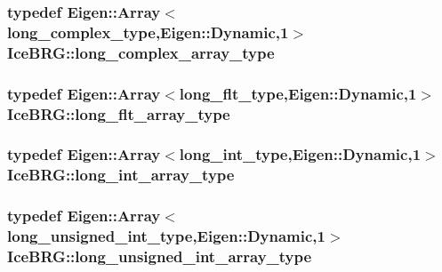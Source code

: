 \hypertarget{namespaceIceBRG_acf641fef465eff0b8d32ec8895129d26}{
\subsubsection[{long\-\_\-complex\-\_\-array\-\_\-type}]{\setlength{\rightskip}{0pt plus 5cm}typedef Eigen\-::\-Array$<${\bf long\-\_\-complex\-\_\-type},Eigen\-::\-Dynamic,1$>$ {\bf Ice\-B\-R\-G\-::long\-\_\-complex\-\_\-array\-\_\-type}}}\label{namespaceIceBRG_acf641fef465eff0b8d32ec8895129d26}
\hypertarget{namespaceIceBRG_a92601c7ccb2563723f800de23ba666a6}{
\subsubsection[{long\-\_\-flt\-\_\-array\-\_\-type}]{\setlength{\rightskip}{0pt plus 5cm}typedef Eigen\-::\-Array$<${\bf long\-\_\-flt\-\_\-type},Eigen\-::\-Dynamic,1$>$ {\bf Ice\-B\-R\-G\-::long\-\_\-flt\-\_\-array\-\_\-type}}}\label{namespaceIceBRG_a92601c7ccb2563723f800de23ba666a6}
\hypertarget{namespaceIceBRG_a17a6514be330cb5afcbb419e6c50e844}{
\subsubsection[{long\-\_\-int\-\_\-array\-\_\-type}]{\setlength{\rightskip}{0pt plus 5cm}typedef Eigen\-::\-Array$<${\bf long\-\_\-int\-\_\-type},Eigen\-::\-Dynamic,1$>$ {\bf Ice\-B\-R\-G\-::long\-\_\-int\-\_\-array\-\_\-type}}}\label{namespaceIceBRG_a17a6514be330cb5afcbb419e6c50e844}
\hypertarget{namespaceIceBRG_aceb755f0ad553ba8e208e6d6d3855c97}{
\subsubsection[{long\-\_\-unsigned\-\_\-int\-\_\-array\-\_\-type}]{\setlength{\rightskip}{0pt plus 5cm}typedef Eigen\-::\-Array$<${\bf long\-\_\-unsigned\-\_\-int\-\_\-type},Eigen\-::\-Dynamic,1$>$ {\bf Ice\-B\-R\-G\-::long\-\_\-unsigned\-\_\-int\-\_\-array\-\_\-type}}}\label{namespaceIceBRG_aceb755f0ad553ba8e208e6d6d3855c97}
